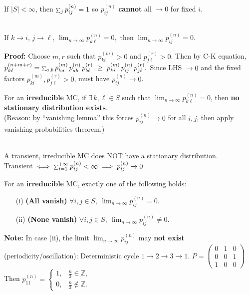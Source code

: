 \documentclass[a4paper, landscape]{article}
\newcommand{\subtopic}[1]{\par\textbf{#1}}
\newcommand{\smallsum}{\mathop{\scalebox{0.65}{$\sum$}}\nolimits}
\renewcommand{\subtopic}[1]{\par\textbf{\color{blue}{#1}}} %
\begin{document}
\begin{multicols}{4}
\subtopic{Finite state remark:}
If $|S|<\infty$, then $\smallsum_j p^{(n)}_{ij}=1$ so $p^{(n)}_{ij}$ \textbf{cannot} all $\to 0$ for fixed $i$.


\subtopic{Vanishing lemma:}\\
If $k\to i$, $j\to \ell$, $\lim_{n\to\infty}p^{(n)}_{k\ell}=0,$
then $\lim_{n\to\infty}p^{(n)}_{ij}=0.$


\textbf{Proof:}
Choose $m,r$ such that $p^{(m)}_{ki}>0$ and $p^{(r)}_{j\ell}>0$. Then by C-K equation,
$p^{(n+m+r)}_{k\ell}
=
\smallsum_{a,b} p^{(m)}_{ka}\,p^{(n)}_{ab}\,p^{(r)}_{b\ell}
\ \ge\ 
p^{(m)}_{ki}\,p^{(n)}_{ij}\,p^{(r)}_{j\ell}.$ Since LHS $\to 0$ and the fixed factors $p^{(m)}_{ki},p^{(r)}_{j\ell}>0$,
must have $p^{(n)}_{ij}\to 0$.

\subtopic{Corollary (irreducible + one pair vanishes):}
For an \textbf{irreducible} MC, if $\exists\, k,\ell\in S$ such that $\lim_{n\to\infty} p^{(n)}_{k\ell}=0$,
then \textbf{no stationary distribution exists}.\\
(Reason: by “vanishing lemma” this forces $p^{(n)}_{ij}\to0$ for all $i,j$, then apply vanishing-probabilities theorem.)

\subtopic{Corollary (transient + irreducible $\not\Rightarrow$ stationary):}\\
A transient, irreducible MC does NOT have a stationary distribution.\\
Transient $\iff \smallsum_{i=1}^{+\infty}p_{ij}^{(n)}<\infty\implies p_{ij}^{(n)}\xrightarrow{}{0}$ 


\subtopic{Corollary (“vanishing together” dichotomy):}
For an \textbf{irreducible} MC, exactly one of the following holds:
\begin{itemize}
  \item[(i)] \textbf{(All vanish)} $\forall i,j\in S,\ \lim_{n\to\infty} p^{(n)}_{ij}=0$.
  \item[(ii)] \textbf{(None vanish)} $\forall i,j\in S,\ \lim_{n\to\infty} p^{(n)}_{ij}\neq 0$.
\end{itemize}
\textbf{Note:} In case (ii), the limit $\lim_{n\to\infty}p^{(n)}_{ij}$ may \textbf{not exist} (periodicity/oscillation):
Deterministic cycle $1\to2\to3\to1$.
$
P=
\begin{pmatrix}
    0 & 1& 0\\
    0 & 0& 1\\
    1 & 0& 0
\end{pmatrix}
$
Then $p^{(n)}_{11}=
\begin{cases}
1, & \frac n 3\in \mathbb Z,\\
0, & \frac n 3 \not\in \mathbb Z.
\end{cases}$


\end{multicols}
\end{document}
